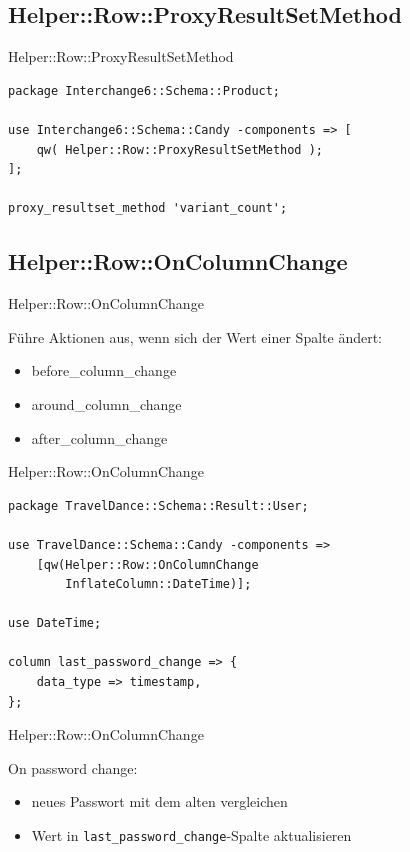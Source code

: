 \subsection{Helper::Row::ProxyResultSetMethod}

\begin{frame}[fragile]{Helper::Row::ProxyResultSetMethod}
\begin{lstlisting}
package Interchange6::Schema::Product;

use Interchange6::Schema::Candy -components => [
    qw( Helper::Row::ProxyResultSetMethod );
];

proxy_resultset_method 'variant_count';
\end{lstlisting}
\end{frame}

\subsection{Helper::Row::OnColumnChange}

\begin{frame}[fragile]{Helper::Row::OnColumnChange}

Führe Aktionen aus, wenn sich der Wert
einer Spalte ändert:

\begin{itemize}
\item before\_column\_change
\item around\_column\_change
\item after\_column\_change
\end{itemize}

\end{frame}

\begin{frame}[fragile]{Helper::Row::OnColumnChange}

\begin{lstlisting}
package TravelDance::Schema::Result::User;

use TravelDance::Schema::Candy -components =>
    [qw(Helper::Row::OnColumnChange 
        InflateColumn::DateTime)];

use DateTime;

column last_password_change => {
    data_type => timestamp,
};
\end{lstlisting}
\end{frame}

\begin{frame}[fragile]{Helper::Row::OnColumnChange}

On password change:

\begin{itemize}
\item neues Passwort mit dem alten vergleichen
\item Wert in \verb|last_password_change|-Spalte aktualisieren
\end{itemize}

\end{frame}

